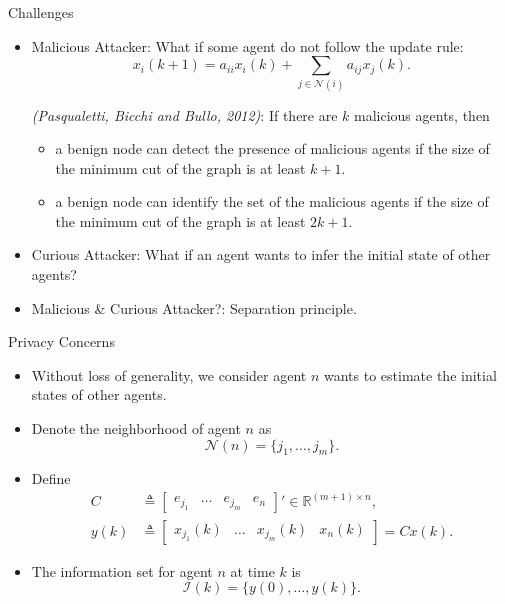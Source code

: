 \documentclass[10pt]{beamer}
\DeclareMathOperator{\1}{\textbf{1}}
\begin{document}
      \begin{frame}{Challenges}
	\begin{itemize}
	  \item Malicious Attacker: What if some agent do not follow the update rule:
	    \begin{displaymath}
	      x_i(k+1) = a_{ii} x_{i}(k) + \sum_{j\in \mathcal N(i)} a_{ij} x_{j}(k).  
	    \end{displaymath}

	    \emph{(Pasqualetti, Bicchi and Bullo, 2012)}: If there are $k$ malicious agents, then
	    \begin{itemize}
	      \item a benign node can detect the presence of malicious agents if the size of the minimum cut of the graph is at least $k + 1$.
	      \item a benign node can identify the set of the malicious agents if the size of the minimum cut of the graph is at least $2k + 1$.
	    \end{itemize} 

	  \item Curious Attacker: What if an agent wants to infer the initial state of other agents?
	  \item Malicious \& Curious Attacker?: Separation principle.
	\end{itemize}
      \end{frame}

      \begin{frame}{Privacy Concerns}
	\begin{itemize}
	  \item Without loss of generality, we consider agent $n$ wants to estimate the initial states of other agents.
	  \item Denote the neighborhood of agent $n$ as
	    \begin{displaymath}
	      \mathcal N(n) = \{j_1,\dots,j_m\}.
	    \end{displaymath}
	  \item Define
	    \begin{displaymath}
	      \begin{split}
		C &\triangleq \begin{bmatrix}
		  e_{j_1}&\dots&e_{j_m}&e_n
		\end{bmatrix}' \in \mathbb R^{(m+1)\times n},\\
		  y(k)&\triangleq \begin{bmatrix}x_{j_1}(k)&\dots&x_{j_m}(k)&x_n(k)
		  \end{bmatrix}=Cx(k).
		  \end{split}
		\end{displaymath}
	      \item The information set for agent $n$ at time $k$ is 
		\begin{displaymath}
		  \mathcal I(k) = \{y(0),\dots,y(k)\}. 
		\end{displaymath}
	    \end{itemize}
	  \end{frame}
\end{document}
